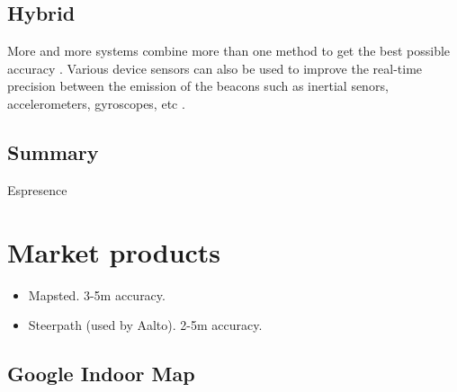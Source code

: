 \subsection{Hybrid}

More and more systems combine more than one method to get the best possible accuracy \cite{shang_overview_2022}. Various device sensors can also be used to improve the real-time precision between the emission of the beacons such as inertial senors, accelerometers, gyroscopes, etc \cite{ali_locali_2017}. 

\subsection{Summary}

Espresence

\section{Market products}

\begin{itemize}
    \item Mapsted. 3-5m accuracy.
    \item Steerpath (used by Aalto). 2-5m accuracy.
\end{itemize}

\subsection{Google Indoor Map}
